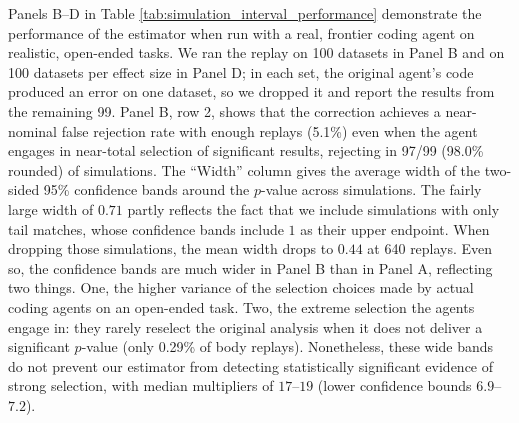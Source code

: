 \documentclass[10pt]{article}
\begin{document}
Panels B--D in Table \ref{tab:simulation_interval_performance} demonstrate the performance of the estimator when run with a real, frontier coding agent on realistic, open-ended tasks. We ran the replay on 100 datasets in Panel B and on 100 datasets per effect size in Panel D; in each set, the original agent's code produced an error on one dataset, so we dropped it and report the results from the remaining 99. Panel B, row 2, shows that the correction achieves a near-nominal false rejection rate with enough replays (5.1\%) even when the agent engages in near-total selection of significant results, rejecting in 97/99 (98.0\% rounded) of simulations. The ``Width'' column gives the average width of the two-sided 95\% confidence bands around the $p$-value across simulations. The fairly large width of $0.71$ partly reflects the fact that we include simulations with only tail matches, whose confidence bands include $1$ as their upper endpoint. When dropping those simulations, the mean width drops to $0.44$ at 640 replays. Even so, the confidence bands are much wider in Panel B than in Panel A, reflecting two things. One, the higher variance of the selection choices made by actual coding agents on an open-ended task. Two, the extreme selection the agents engage in: they rarely reselect the original analysis when it does not deliver a significant $p$-value (only 0.29\% of body replays). Nonetheless, these wide bands do not prevent our estimator from detecting statistically significant evidence of strong selection, with median multipliers of $17$--$19$ (lower confidence bounds $6.9$--$7.2$).
\end{document}
